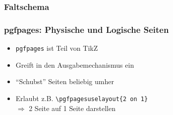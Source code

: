 \documentclass[12pt,ngerman]{beamer}
\begin{document}
\begin{frame}
\frametitle{Faltschema}

\end{frame}

\begin{frame}
\frametitle{pgfpages: Physische und Logische Seiten}

\begin{itemize}
\item \texttt{pgfpages} ist Teil von TikZ
\item Greift in den Ausgabemechanismus ein
\item \enquote{Schubst} Seiten beliebig umher
\item Erlaubt z.B. \texttt{\textbackslash pgfpagesuselayout\{2 on 1\}} \\ $\Rightarrow$ 2 Seite auf 1 Seite darstellen
\end{itemize}
\end{frame}
\end{document}
